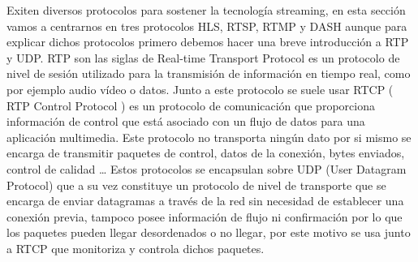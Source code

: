 Exiten diversos protocolos para sostener la tecnología streaming, en esta sección vamos a centrarnos en tres protocolos HLS, RTSP, RTMP y DASH  aunque para explicar dichos protocolos primero debemos hacer una breve introducción a RTP y UDP.
RTP son las siglas de Real-time Transport Protocol es un protocolo de nivel de sesión utilizado para la transmisión de información en tiempo real, como por ejemplo audio vídeo o datos. Junto a este protocolo se suele usar RTCP ( RTP Control Protocol )  es un protocolo de comunicación que proporciona información de control que está asociado con un flujo de datos para una aplicación multimedia. Este protocolo no transporta ningún dato por si mismo se encarga de transmitir paquetes de control, datos de la conexión, bytes enviados, control de calidad …
Estos protocolos se encapsulan sobre UDP (User Datagram Protocol) que a su vez constituye un protocolo de nivel de transporte que se encarga de enviar datagramas a través de la red sin necesidad de establecer una conexión previa, tampoco posee información de flujo ni confirmación por lo que los paquetes pueden llegar desordenados o no llegar, por este motivo se usa junto a RTCP que monitoriza y controla dichos paquetes.

